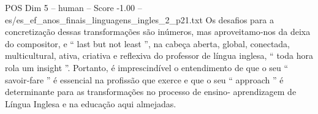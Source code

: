 \begin{textsample}{POS Dim 5 – human – Score -1.00 – es/es\_ef\_anos\_finais\_linguagens\_ingles\_2\_p21.txt}  \label{ex:f5_pos_011}
Os desafios para a concretização dessas transformações são inúmeros, mas aproveitamo‐nos da deixa do compositor, e “ last but not least ”, na cabeça aberta, global, conectada, multicultural, ativa, criativa e reflexiva do professor de língua inglesa, “ toda hora rola um insight ”.
Portanto, é imprescindível o entendimento de que o seu “ savoir‐fare ” é essencial na profissão que exerce e que o seu “ approach ” é determinante para as transformações no processo de ensino‐ aprendizagem de Língua Inglesa e na educação aqui almejadas.

\end{textsample}
